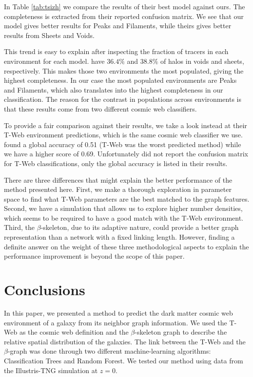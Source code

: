 \documentclass[usenatbib]{mnras}
\begin{document}
In Table \ref{tab:tsizh} we compare the results of their best model against ours.
The completeness is extracted from their reported confusion matrix.
We see that our model gives better results for Peaks and Filaments, while theirs gives better results from Sheets and Voids.

This trend is easy to explain after inspecting the fraction of tracers in each environment for each model.
\cite{Tsizh2019} have $36.4\%$ and $38.8\%$ of halos in voids and sheets, respectively. 
This makes those two environments the most populated, giving the highest completeness.
In our case the most populated environments are Peaks and Filaments, which also translates into the highest completeness in our classification.
The reason for the contrast in populations across environments is that these results come from two different cosmic web classifiers.


To provide a fair comparison against their results, we take a look instead at their T-Web environment predictions, which is the same cosmic web classifier we use.
\cite{Tsizh2019} found a global accuracy of 0.51 (T-Web was the worst predicted method) while we have a higher score of 0.69.
Unfortunately \cite{Tsizh2019} did not report the confusion matrix for T-Web classifications, only the global accuracy is listed in their results.

There are three differences that might explain the better performance of the method presented here. 
First, we make a thorough exploration in parameter space to find what T-Web parameters are the best matched to the graph features.
Second, we have a simulation that allows us  to explore higher number densities, which seems to be required to have a good match with the T-Web environment.
Third, the $\beta$-skeleton, due to its adaptive nature, could provide a better graph representation than a network with a fixed linking length.
However, finding a definite answer on the weight of these three methodological aspects to explain the performance improvement is beyond the scope of this paper.



\section{Conclusions}\label{sec:conclusions}

In this paper, we presented a method to predict the dark matter cosmic web environment of a galaxy from its neighbor graph information.
We used the T-Web as the cosmic web definition \citep{Forero-Romero2009} and the $\beta$-skeleton graph \citep{Fang2019} to describe the relative spatial distribution of the galaxies. 
The link between the T-Web and the $\beta$-graph was done through two different machine-learning algorithms: Classification Trees and Random Forest.
We tested our method using data from the Illustris-TNG simulation \citep{Nelson2019} at $z=0$. 
\end{document}
